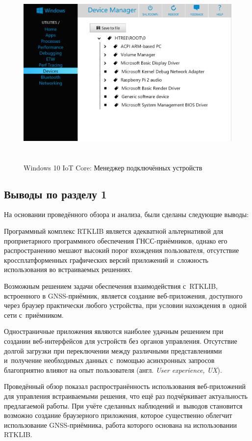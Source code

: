\begin{figure}[h!]
  \centering
  \includegraphics[height=9.5cm]{img/win10-settings}
  \vspace*{12pt}
  \caption{Windows 10 IoT Core: Менеджер подключённых устройств}\label{fig:win10-settings}
\end{figure}

\subsection{Выводы по разделу 1}
\label{subsec:section1-conclusions}

На основании проведённого обзора и анализа, были сделаны следующие выводы:

\begin{dashitemize}
  \item Программный комплекс RTKLIB является адекватной альтернативой для проприетарного программного обеспечения ГНСС-приёмников, однако его распространению мешают высокий порог вхождения пользователя, отсутствие кроссплатформенных графических версий приложений и~сложность использования во встраиваемых решениях.
  \item Возможным решением задачи обеспечения взаимодействия с~RTKLIB, встроенного в GNSS-приёмник, является создание веб-приложения, доступного через браузер практически любого устройства, при условии нахождения в~одной сети с~приёмником.
  \item Одностраничные приложения являются наиболее удачным решением при создании веб-интерфейсов для устройств без органов управления. Отсутствие долгой загрузки при переключении между различными представлениями и~получение необходимых данных с~помощью асинхронных запросов благоприятно влияют на опыт пользователя (англ. \emph{User experience, UX}).
\end{dashitemize}

Проведённый обзор показал распространённость использования веб-приложений для управления встраиваемыми решения, что ещё раз подчёркивает актуальность предлагаемой работы. При учёте сделанных наблюдений и~выводов становится возможно создание браузерного приложения, которое существенно облегчит использование GNSS-приёмника, работа которого основана на использовании RTKLIB.

\newpage
